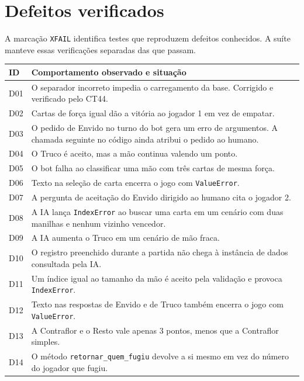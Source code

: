 \documentclass[11pt,a4paper]{article}
\begin{document}
\section{Defeitos verificados}

A marcação \texttt{XFAIL} identifica testes que reproduzem defeitos conhecidos. A suíte manteve essas verificações separadas das que passam.

\begin{longtable}{>{\raggedright\arraybackslash}p{}>{\raggedright\arraybackslash}p{}}
\toprule
\rowcolor{cabecalho}\textbf{ID} & \textbf{Comportamento observado e situação} \\
\midrule
\endhead
D01 & O separador incorreto impedia o carregamento da base. Corrigido e verificado pelo CT44. \\
D02 & Cartas de força igual dão a vitória ao jogador 1 em vez de empatar. \\
D03 & O pedido de Envido no turno do bot gera um erro de argumentos. A chamada seguinte no código ainda atribui o pedido ao humano. \\
D04 & O Truco é aceito, mas a mão continua valendo um ponto. \\
D05 & O bot falha ao classificar uma mão com três cartas de mesma força. \\
D06 & Texto na seleção de carta encerra o jogo com \texttt{ValueError}. \\
D07 & A pergunta de aceitação do Envido dirigido ao humano cita o jogador 2. \\
D08 & A IA lança \texttt{IndexError} ao buscar uma carta em um cenário com duas manilhas e nenhum vizinho vencedor. \\
D09 & A IA aumenta o Truco em um cenário de mão fraca. \\
D10 & O registro preenchido durante a partida não chega à instância de dados consultada pela IA. \\
D11 & Um índice igual ao tamanho da mão é aceito pela validação e provoca \texttt{IndexError}. \\
D12 & Texto nas respostas de Envido e de Truco também encerra o jogo com \texttt{ValueError}. \\
D13 & A Contraflor e o Resto vale apenas 3 pontos, menos que a Contraflor simples. \\
D14 & O método \texttt{retornar\_quem\_fugiu} devolve a si mesmo em vez do número do jogador que fugiu. \\
\bottomrule
\end{longtable}
\end{document}
